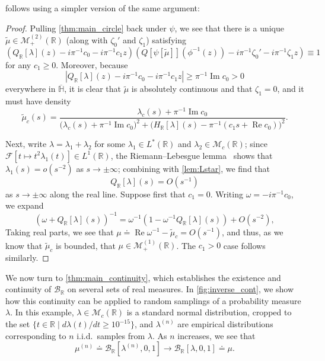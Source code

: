 \documentclass{cams-l} %
\newcommand{\dave}[1]{#1}\newcommand{\davebegin}{}\newcommand{\daveend}{}\newcommand{\george}[1]{#1}
\newcommand{\RR}{\mathbb R}
\newcommand{\HH}{\mathbb H}
\newcommand{\cM}{\mathcal M}
\newcommand{\cB}{\mathcal B}
\newcommand{\cF}{\mathcal F}
\newcommand{\ovl}[1]{{\overline{#1}}}
\newcommand{\op}{\operatorname}
\renewcommand{\Re}{\op{Re}}
\renewcommand{\Im}{\op{Im}}
\theoremstyle{definition}
\theoremstyle{remark}
\numberwithin{equation}{section}
\begin{document}
 follows using \dave{a simpler version of the same argument}:
\propeasyone*
\begin{proof}
    Pulling \cref{thm:main_circle} back under $\psi$, we see that there is a unique $\widetilde{\mu}\in\cM_+^{(2)}(\RR)$ (along with $\zeta_0'$ and $\zeta_1$) satisfying
    \[\left(Q_\RR[\lambda](z) -i\pi^{-1}c_0 - i\pi^{-1}c_1z\right)\left(Q[\psi[\widetilde{\mu}]](\phi^{-1}(z)) - i\pi^{-1}\zeta_0' - i\pi^{-1}\zeta_1z\right)\equiv 1\]
    for any $c_1\geq 0$. Moreover, because 
    \[\left|Q_\RR[\lambda](z) -i\pi^{-1}c_0 - i\pi^{-1}c_1z\right| \geq \pi^{-1}\Im c_0 > 0\]
    everywhere in $\ovl{\HH}$, it is clear that $\widetilde{\mu}$ is absolutely continuous and that $\zeta_1 = 0$, and it must have density
    \[\widetilde{\mu}_c(s) = \frac{\lambda_c(s) + \pi^{-1}\Im c_0}{\big(\lambda_c(s) + \pi^{-1}\Im c_0\big)^2 + \big(H_\RR[\lambda](s) - \pi^{-1}(c_1s + \Re c_0)\big)^2}.\]

    
    Next, write $\lambda = \lambda_1+\lambda_2$ for some $\lambda_1\in L^*(\RR)$ and $\lambda_2\in\cM_c(\RR)$; since $\cF[t\mapsto t^2\lambda_1(t)]\in L^1(\RR)$, the Riemann--Lebesgue lemma~\cite{royden2010real} shows that $\lambda_1(s) = o(s^{-2})$ as $s\to\pm\infty$; combining with \cref{lem:Lstar}, we find that
    \[Q_\RR[\lambda](s) = O(s^{-1})\]
    as $s\to\pm\infty$ along the real line. Suppose first that $c_1 = 0$. Writing $\omega = -i\pi^{-1}c_0$, we expand
    \[\left(\omega + Q_\RR[\lambda](s)\right)^{-1} = \omega^{-1}\left(1 - \omega^{-1}Q_\RR[\lambda](s)\right) + O(s^{-2}),\]
    Taking real parts, we see that $\mu\doteq\Re\omega^{-1}-\widetilde{\mu}_c=O(s^{-1})$, and thus, as we know that $\widetilde{\mu}_c$ is bounded, that $\mu\in\cM_+^{(1)}(\RR)$. The $c_1>0$ case follows similarly.
\end{proof}

We now turn to \cref{thm:main_continuity}, which establishes the existence and continuity of $\cB_\RR$ on several sets of real measures. In \cref{fig:inverse_cont}, we show how this continuity can be applied to random samplings of a probability measure $\lambda$. In this example, $\lambda\in\cM_c(\RR)$ is a standard normal distribution, cropped to the set $\{t\in\RR\;|\;d\lambda(t)/dt \geq 10^{-15}\}$, and $\lambda^{(n)}$ are empirical distributions corresponding to $n$ i.i.d.~samples from $\lambda$. As $n$ increases, we see that
\[\mu^{(n)}\doteq \cB_\RR[\lambda^{(n)},0,1]\to\cB_\RR[\lambda,0,1] \doteq \mu.\]
\end{document}
